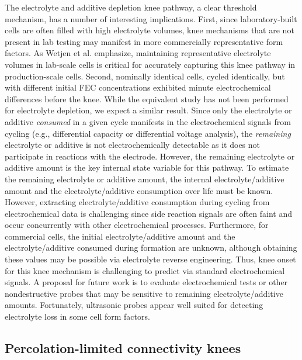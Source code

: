 \documentclass[journal=jpclcd,manuscript=article]{achemso}
\begin{document}
The electrolyte and additive depletion knee pathway, a clear threshold mechanism, has a number of interesting implications.
First, since laboratory-built cells are often filled with high electrolyte volumes, knee mechanisms that are not present in lab testing may manifest in more commercially representative form factors.
As Wetjen et al.\cite{wetjen_differentiating_2017} emphasize,
maintaining representative electrolyte volumes in lab-scale cells is critical for accurately capturing this knee pathway in production-scale cells.
Second, nominally identical cells, cycled identically, but with different initial FEC concentrations exhibited minute electrochemical differences before the knee.\cite{jung_consumption_2016}
While the equivalent study has not been performed for electrolyte depletion, we expect a similar result.
Since only the electrolyte or additive \textit{consumed} in a given cycle manifests in the electrochemical signals from cycling (e.g., differential capacity or differential voltage analysis), the \textit{remaining} electrolyte or additive is not electrochemically detectable as it does not participate in reactions with the electrode.
However, the remaining electrolyte or additive amount is the key internal state variable for this pathway.
To estimate the remaining electrolyte or additive amount, the internal electrolyte/additive amount and the electrolyte/additive consumption over life must be known.
However, extracting electrolyte/additive consumption during cycling from electrochemical data is challenging since side reaction signals are often faint and occur concurrently with other electrochemical processes.
Furthermore, for commercial cells, the initial electrolyte/additive amount and the electrolyte/additive consumed during formation are unknown, although obtaining these values may be possible via electrolyte reverse engineering.
Thus, knee onset for this knee mechanism is challenging to predict via standard electrochemical signals.
A proposal for future work is to evaluate electrochemical tests or other nondestructive probes that may be sensitive to remaining electrolyte/additive amounts.
Fortunately, ultrasonic probes appear well suited for detecting electrolyte loss in some cell form factors.\cite{knehr_understanding_2018, deng_ultrasonic_2020}

\subsection{Percolation-limited connectivity knees}
\end{document}
